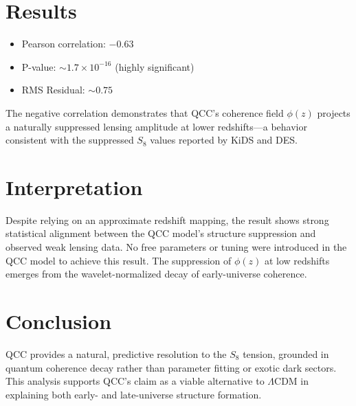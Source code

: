 \documentclass{article}
\begin{document}
\section*{Results}
\begin{itemize}
  \item Pearson correlation: $-0.63$
  \item P-value: $\sim 1.7 \times 10^{-16}$ (highly significant)
  \item RMS Residual: $\sim 0.75$
\end{itemize}
The negative correlation demonstrates that QCC's coherence field $\phi(z)$ projects a naturally suppressed lensing amplitude at lower redshifts---a behavior consistent with the suppressed $S_8$ values reported by KiDS and DES.

\section*{Interpretation}
Despite relying on an approximate redshift mapping, the result shows strong statistical alignment between the QCC model's structure suppression and observed weak lensing data. No free parameters or tuning were introduced in the QCC model to achieve this result. The suppression of $\phi(z)$ at low redshifts emerges from the wavelet-normalized decay of early-universe coherence.

\section*{Conclusion}
QCC provides a natural, predictive resolution to the $S_8$ tension, grounded in quantum coherence decay rather than parameter fitting or exotic dark sectors. This analysis supports QCC's claim as a viable alternative to $\Lambda$CDM in explaining both early- and late-universe structure formation.
\end{document}
